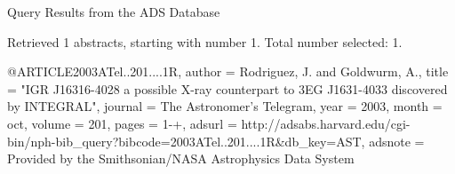 Query Results from the ADS Database


Retrieved 1 abstracts, starting with number 1.  Total number selected: 1.

@ARTICLE{2003ATel..201....1R,
   author = {{Rodriguez}, J. and {Goldwurm}, A.},
    title = "{IGR J16316-4028 a possible X-ray counterpart to 3EG J1631-4033 discovered by INTEGRAL}",
  journal = {The Astronomer's Telegram},
     year = 2003,
    month = oct,
   volume = 201,
    pages = {1-+},
   adsurl = {http://adsabs.harvard.edu/cgi-bin/nph-bib_query?bibcode=2003ATel..201....1R&db_key=AST},
  adsnote = {Provided by the Smithsonian/NASA Astrophysics Data System}
}


